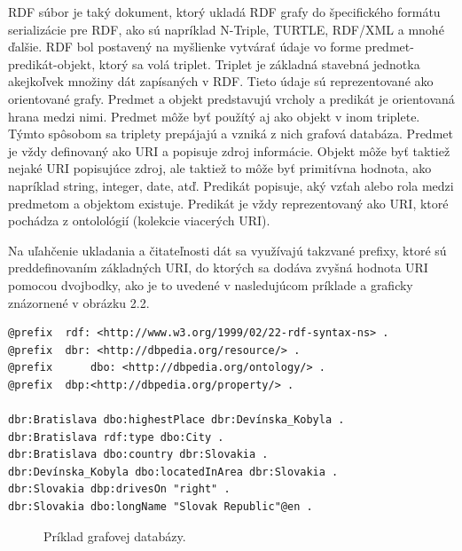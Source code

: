\documentclass[12pt, a4paper, oneside]{book}
\begin{document}


RDF súbor je taký dokument, ktorý ukladá RDF grafy do špecifického formátu serializácie pre RDF, ako sú napríklad N-Triple, TURTLE, RDF/XML a mnohé ďalšie. RDF bol postavený na myšlienke vytvárať údaje vo forme predmet-predikát-objekt, ktorý sa volá triplet. Triplet je základná stavebná jednotka akejkoľvek množiny dát zapísaných v RDF. Tieto údaje sú reprezentované ako orientované grafy. Predmet a objekt predstavujú vrcholy a predikát je orientovaná hrana medzi nimi. Predmet môže byť použítý aj ako objekt v inom triplete. Týmto spôsobom sa triplety prepájajú a vzniká z nich grafová databáza. Predmet je vždy definovaný ako URI a popisuje zdroj informácie. Objekt môže byť taktiež nejaké URI popisujúce zdroj, ale taktiež to môže byť primitívna hodnota, ako napríklad string, integer, date, atď. Predikát popisuje, aký vzťah alebo rola medzi predmetom a objektom existuje. Predikát je vždy reprezentovaný ako URI, ktoré pochádza z ontolológií (kolekcie viacerých URI).


Na uľahčenie ukladania a čitateľnosti dát sa využívajú takzvané prefixy, ktoré sú preddefinovaním základných URI, do ktorých sa dodáva zvyšná hodnota URI pomocou dvojbodky, ako je to uvedené v nasledujúcom príklade a graficky znázornené v obrázku 2.2.
\begin{verbatim}
@prefix  rdf: <http://www.w3.org/1999/02/22-rdf-syntax-ns> .
@prefix	 dbr: <http://dbpedia.org/resource/> .
@prefix 	 dbo: <http://dbpedia.org/ontology/> .
@prefix  dbp:<http://dbpedia.org/property/> .

dbr:Bratislava dbo:highestPlace dbr:Devínska_Kobyla .
dbr:Bratislava rdf:type dbo:City .
dbr:Bratislava dbo:country dbr:Slovakia .
dbr:Devínska_Kobyla dbo:locatedInArea dbr:Slovakia .
dbr:Slovakia dbp:drivesOn "right" .
dbr:Slovakia dbo:longName "Slovak Republic"@en .
\end{verbatim}

\begin{figure}[h]
\label{fig:semantic_web}
\caption{Príklad grafovej databázy.}
\end{figure}
\end{document}
